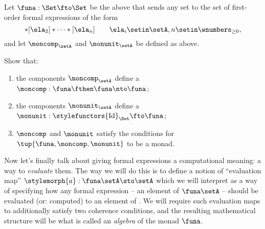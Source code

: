 \begin{gradedexercise}
    \label{ex:ListMonad}
    Let $\funa : \Set \fto \Set$ be the  above that sends any set \setA to the set of first-order formal expressions of the form
    \begin{equation}
        [\ela_1]
        * [\ela_2] * \cdots * [\ela_n] \quad \quad \ela_i \setin \setA, n \setin \wnumbers_{\geq 0},
    \end{equation}
    and let $\moncomp_\setA$ and $\monunit_\setA$ be defined as above.

    Show that:
    \begin{enumerate}
        \item the components $\moncomp_\setA$ define a  $\moncomp : \funa \fthen \funa \nto \funa$;
        \item the components $\monunit_\setA$ define a  $\monunit : \stylefunctors{\text{Id}}_{\Set} \fto \funa$;
        \item $\moncomp$ and $\monunit$ satisfy the conditions for $\tup{\funa, \moncomp, \monunit}$ to be a monad.
    \end{enumerate}
\end{gradedexercise}


Now let's finally talk about giving formal expressions a computational meaning: a way to \emph{evaluate} them.
The way we will do this is to define a notion of ``evaluation map'' $\stylemorph{a}: \funa \setA \sto \setA$ which we will interpret as a way of specifying how any formal expression -- an element of $\funa \setA$ -- should be evaluated (or: computed) to an element of \setA.
We will require such evaluation maps to additionally satisfy two coherence conditions, and the resulting mathematical structure will be what is called an \emph{algebra} of the monad $\funa$.


